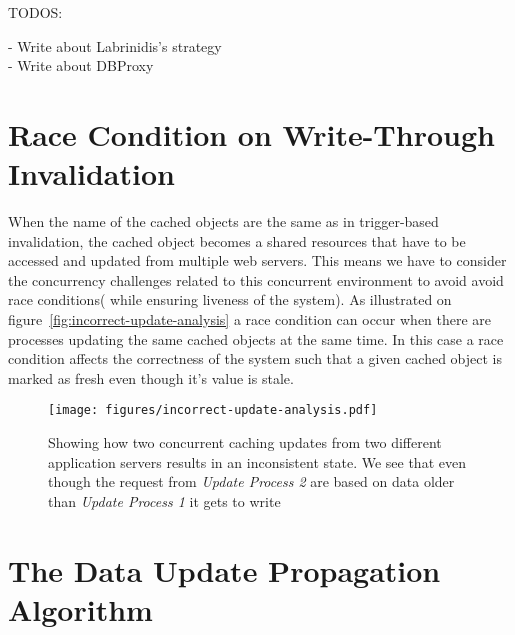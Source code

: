 TODOS:

- Write about Labrinidis's strategy \\
- Write about DBProxy



\section{Race Condition on Write-Through Invalidation}
\label{sec:race-condition-on-write-through-invalidation}

When the name of the cached objects are the same as in trigger-based invalidation, the cached object becomes a shared resources that have to be accessed and updated from multiple web servers. This means we have to consider the concurrency challenges related to this concurrent environment to avoid avoid race conditions( while ensuring liveness of the system).
As illustrated on figure~\ref{fig:incorrect-update-analysis} a race condition can occur when there are processes updating the same cached objects at the same time. In this case a race condition affects the correctness of the system such that a given cached object is marked as fresh even though it's value is stale.

\begin{figure*}[ht!]
  \centering
  \texttt{[image: figures/incorrect-update-analysis.pdf]}
  \caption{Showing how two concurrent caching updates from two different application servers results in an inconsistent state. We see that even though the request from \emph{Update Process 2} are based on data older than \emph{Update Process 1} it gets to write }
  \label{fig:incorrect-updates-analysis}
\end{figure*}


\section{The Data Update Propagation Algorithm}
\label{sec:the-data-update-propagation-algorithm}

